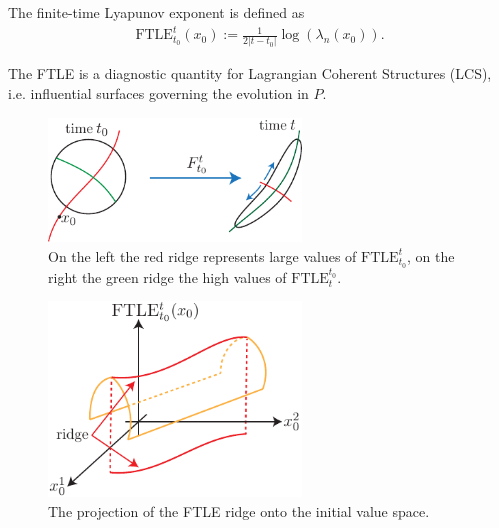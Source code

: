 \begin{definition}
	The finite-time Lyapunov exponent is defined as
	\begin{align}
		\boxed{ \textrm{FTLE} _{t_0}^{t}( {x}_0) := \frac{1}{2|t-t_0|} \log(\lambda_n( {x}_0)).}
	\end{align}
\end{definition}
The FTLE is a diagnostic quantity for Lagrangian Coherent Structures (LCS), i.e. influential surfaces governing the evolution in $P$.
\begin{figure}[h!]
	\centering
	\includegraphics[width=0.6\textwidth]{figures/ch1/9deformation.pdf}
	\caption{On the left the red ridge represents large values of $ \textrm{FTLE} _{t_0}^{t}$, on the right the green ridge the high values of $ \textrm{FTLE} _{t}^{t_0}$.}
	\label{fig:FTLE_ridges}
\end{figure}
\begin{figure}[h!]
	\centering
	\includegraphics[width=0.6\textwidth]{figures/ch1/10ridge_projection}
	\caption{The projection of the FTLE ridge onto the initial value space.}
	\label{fig:FTLE_surface}
\end{figure}

